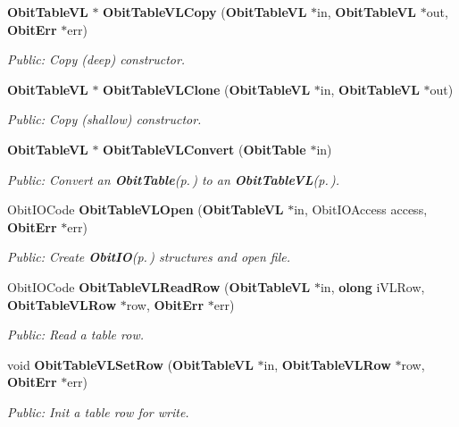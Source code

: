 \begin{CompactItemize}
{\bf Obit\-Table\-VL} $\ast$ {\bf Obit\-Table\-VLCopy} ({\bf Obit\-Table\-VL} $\ast$in, {\bf Obit\-Table\-VL} $\ast$out, {\bf Obit\-Err} $\ast$err)
\begin{CompactList}\small\item\em Public: Copy (deep) constructor. \item\end{CompactList}\item 
{\bf Obit\-Table\-VL} $\ast$ {\bf Obit\-Table\-VLClone} ({\bf Obit\-Table\-VL} $\ast$in, {\bf Obit\-Table\-VL} $\ast$out)
\begin{CompactList}\small\item\em Public: Copy (shallow) constructor. \item\end{CompactList}\item 
{\bf Obit\-Table\-VL} $\ast$ {\bf Obit\-Table\-VLConvert} ({\bf Obit\-Table} $\ast$in)
\begin{CompactList}\small\item\em Public: Convert an {\bf Obit\-Table}{\rm (p.\,\pageref{structObitTable})} to an {\bf Obit\-Table\-VL}{\rm (p.\,\pageref{structObitTableVL})}. \item\end{CompactList}\item 
Obit\-IOCode {\bf Obit\-Table\-VLOpen} ({\bf Obit\-Table\-VL} $\ast$in, Obit\-IOAccess access, {\bf Obit\-Err} $\ast$err)
\begin{CompactList}\small\item\em Public: Create {\bf Obit\-IO}{\rm (p.\,\pageref{structObitIO})} structures and open file. \item\end{CompactList}\item 
Obit\-IOCode {\bf Obit\-Table\-VLRead\-Row} ({\bf Obit\-Table\-VL} $\ast$in, {\bf olong} i\-VLRow, {\bf Obit\-Table\-VLRow} $\ast$row, {\bf Obit\-Err} $\ast$err)
\begin{CompactList}\small\item\em Public: Read a table row. \item\end{CompactList}\item 
void {\bf Obit\-Table\-VLSet\-Row} ({\bf Obit\-Table\-VL} $\ast$in, {\bf Obit\-Table\-VLRow} $\ast$row, {\bf Obit\-Err} $\ast$err)
\begin{CompactList}\small\item\em Public: Init a table row for write. \item\end{CompactList}\item 

\end{CompactItemize}
